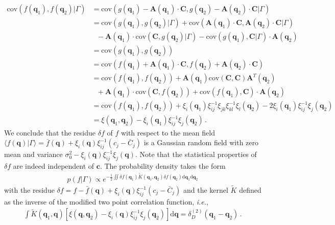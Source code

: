 \documentclass[a4paper, 11pt]{article}
\begin{document}
\begin{align}
\text{cov}(f(\bm{q}_1), f(\bm{q}_2)|\Gamma) 
&= \text{cov}(g(\bm{q}_1) - \bm{A}(\bm{q}_1)\cdot \bm{C}, g(\bm{q}_2) - \bm{A}(\bm{q}_2)\cdot \bm{C}|\Gamma) \\
&= \text{cov}(g(\bm{q}_1), g(\bm{q}_2)|\Gamma) + \text{cov}(\bm{A}(\bm{q}_1)\cdot \bm{C}, \bm{A}(\bm{q}_2)\cdot \bm{C}|\Gamma)\\
&\ \ \  - \bm{A}(\bm{q}_1)\cdot \text{cov}(\bm{C}, g(\bm{q}_2)|\Gamma) -\text{cov}(g(\bm{q}_1) , \bm{C}|\Gamma)\cdot \bm{A}(\bm{q}_2)\\
&= \text{cov}(g(\bm{q}_1), g(\bm{q}_2)) \\
&=\text{cov}(f(\bm{q}_1) + \bm{A}(\bm{q}_1)\cdot \bm{C}, f(\bm{q}_2) + \bm{A}(\bm{q}_2)\cdot \bm{C})\\
&=\text{cov}(f(\bm{q}_1), f(\bm{q}_2)) + \bm{A}(\bm{q}_1) \text{cov}(\bm{C},\bm{C}) \bm{A}^T(\bm{q}_2) \\
&\ \ \ + \bm{A}(\bm{q}_1) \cdot \text{cov}(\bm{C},f(\bm{q}_2))+ \text{cov}(f(\bm{q}_1), \bm{C}) \cdot \bm{A}(\bm{q}_2) \\
&=\text{cov}(f(\bm{q}_1), f(\bm{q}_2)) + \xi_i(\bm{q}_1)\xi_{ij}^{-1}\xi_{jk}\xi_{kl}^{-1}\xi_{l}(\bm{q}_2) - 2\xi_i(\bm{q}_1)\xi_{ij}^{-1}\xi_{j}(\bm{q}_2)\\
&=\xi(\bm{q}_1,\bm{q}_2) - \xi_i(\bm{q}_1) \xi_{ij}^{-1} \xi_j(\bm{q}_2)\,.
\end{align}
We conclude that the residue $\delta f$ of $f$ with respect to the mean field $\langle f(\bm{q})|\Gamma\rangle =\bar{f}(\bm{q})+ \xi_i(\bm{q})\xi_{ij}^{-1}(c_j-\bar{C}_j)$ is a Gaussian random field with zero mean and variance $\sigma_0^2 - \xi_i(\bm{q}) \xi_{ij}^{-1} \xi_j(\bm{q})$. Note that the statistical properties of $\delta f$ are indeed independent of $\bm{c}$. 
The probability density takes the form
\begin{align}
p(f|\Gamma) \propto  e^{-\frac{1}{2} \iint \delta{f}(\bm{q}_1) \tilde{K}(\bm{q}_1,\bm{q}_2) \delta f(\bm{q}_2)\mathrm{d}\bm{q}_1 \mathrm{d}\bm{q}_2 }\label{eq:constraint2}
\end{align}
with the residue $\delta f = f-\bar{f}(\bm{q})+ \xi_i(\bm{q})\xi_{ij}^{-1}(c_j-\bar{C}_j)$ and the kernel $\tilde{K}$ defined as the inverse of the modified two point correlation function, \textit{i.e.},
\begin{align}
\int \tilde{K}(\bm{q}_1,\bm{q}) \left[\xi(\bm{q},\bm{q}_2) - \xi_i(\bm{q})\xi_{ij}^{-1}\xi_j(\bm{q}_2)\right]\mathrm{d}\bm{q}= \delta_D^{(2)}(\bm{q}_1-\bm{q}_2)\,.
\end{align}
\end{document}
